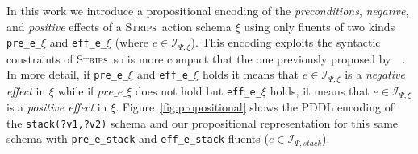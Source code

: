 \documentclass{article}
\newcommand{\strips}{\textsc{Strips}}
\begin{document}
In this work we introduce a propositional encoding of the {\em preconditions}, {\em negative}, and {\em positive} effects of a \strips\ action schema $\xi$ using only fluents of two kinds {\tt\small pre\_e\_$\xi$} and {\tt\small eff\_e\_$\xi$} (where $e\in{\mathcal I}_{\Psi,\xi}$). This encoding exploits the syntactic constraints of \strips\ so is more compact that the one previously proposed by~\citeauthor{aineto2018learning}~\citeyear{aineto2018learning}. In more detail, if {\tt\small pre\_e\_$\xi$} and {\tt\small eff\_e\_$\xi$} holds it means that $e\in{\mathcal I}_{\Psi,\xi}$ is a {\em negative effect} in $\xi$ while if $pre\_e\_\xi$ does not hold but {\tt\small eff\_e\_$\xi$} holds, it means that $e\in{\mathcal I}_{\Psi,\xi}$ is a {\em positive effect} in $\xi$. Figure~\ref{fig:propositional} shows the PDDL encoding of the {\tt\small stack(?v1,?v2)} schema and our propositional representation for this same schema with {\tt\small pre\_e\_stack} and {\tt\small eff\_e\_stack} fluents ($e\in{\mathcal I}_{\Psi,stack}$).
\end{document}
